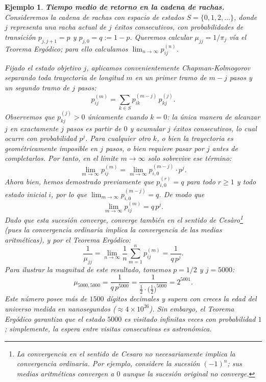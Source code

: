 \documentclass[12pt]{book}
\newtheorem{example}{Ejemplo}[chapter]
\begin{document}
\begin{example}
    \textbf{Tiempo medio de retorno en la cadena de rachas.}
    Consideremos la cadena de rachas con espacio de estados $S = \{0,1,2,\dots\}$, donde $j$ representa una racha actual de $j$ éxitos consecutivos, con probabilidades de transición $p_{j,j+1}=p$ y $p_{j,0}=q:=1-p$. Queremos calcular $\mu_{jj} = 1/\pi_j$ vía el Teorema Ergódico; para ello calculamos $\lim_{n\to\infty}p_{ij}^{(n)}$.

    Fijado el estado objetivo $j$, aplicamos convenientemente Chapman-Kolmogorov separando toda trayectoria de longitud $m$ en un primer tramo de $m-j$ pasos y un segundo tramo de $j$ pasos:
    \[
        p_{ij}^{(m)} = \sum_{k \in S} p_{ik}^{(m-j)}\,p_{kj}^{(j)}.
    \]
    Observemos que $p_{kj}^{(j)}>0$ únicamente cuando $k=0$: la única manera de alcanzar $j$ en exactamente $j$ pasos es partir de $0$ y acumular $j$ éxitos consecutivos, lo cual ocurre con probabilidad $p^j$. Para cualquier otro $k$, o bien la trayectoria es geométricamente imposible en $j$ pasos, o bien requiere pasar por $j$ antes de completarlos. Por tanto, en el límite $m\to\infty$ solo sobrevive ese término:
    \[
        \lim_{m\to\infty} p_{ij}^{(m)} = \lim_{m\to\infty} p_{i,0}^{(m-j)}\cdot p^j.
    \]
    Ahora bien, hemos demostrado previamente que $p_{i,0}^{(r)} = q$ para todo $r \ge 1$ y todo estado inicial $i$, por lo que $\lim_{m\to\infty}p_{i,0}^{(m-j)} = q$. De modo que
    \[
        \lim_{m\to\infty} p_{ij}^{(m)} = q\,p^j.
    \]
    Dado que esta sucesión converge, converge también en el sentido de Cesàro\footnote{La convergencia en el sentido de Cesaro no necesariamente implica la convergencia ordinaria. Por ejemplo, considere la sucesión $(-1)^n$; sus medias aritméticas convergen a $0$ aunque la sucesión original no converge.} (pues la convergencia ordinaria implica la convergencia de las medias aritméticas), y por el Teorema Ergódico:
    \[
        \frac{1}{\mu_{jj}} = \lim_{n\to\infty}\frac{1}{n}\sum_{m=1}^n p_{ij}^{(m)} = \frac{1}{q\,p^j}.
    \]
    Para ilustrar la magnitud de este resultado, tomemos $p=1/2$ y $j=5000$:
    \[
        \mu_{5000,5000} = \frac{1}{q\,p^{5000}} = \frac{1}{\tfrac{1}{2}\cdot\bigl(\tfrac{1}{2}\bigr)^{5000}} = 2^{5001}.
    \]
    Este número posee más de $1500$ dígitos decimales y supera con creces la edad del universo medida en nanosegundos ($\approx 4\times 10^{26}$). Sin embargo, el Teorema Ergódico garantiza que el estado $5000$ es visitado \emph{infinitas veces} con probabilidad $1$; simplemente, la espera entre visitas consecutivas es astronómica.
\end{example}
\end{document}
